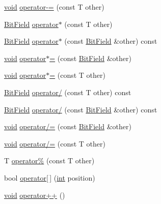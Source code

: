 \begin{DoxyCompactItemize}
\item 
\hyperlink{_s_d_l__opengles2__gl2ext_8h_ae5d8fa23ad07c48bb609509eae494c95}{void} \hyperlink{structmc_1_1_bit_field_acb4ec204eda22806184cd29fe680fafa}{operator-\/=} (const T other)
\item 
\hyperlink{structmc_1_1_bit_field}{Bit\+Field} \hyperlink{structmc_1_1_bit_field_a3c2535a2b22b7e0b03e686d4dab2b8a3}{operator$\ast$} (const T other)
\item 
\hyperlink{structmc_1_1_bit_field}{Bit\+Field} \hyperlink{structmc_1_1_bit_field_ab372262696caa9c17635e1f29303582b}{operator$\ast$} (const \hyperlink{structmc_1_1_bit_field}{Bit\+Field} \&other) const 
\item 
\hyperlink{_s_d_l__opengles2__gl2ext_8h_ae5d8fa23ad07c48bb609509eae494c95}{void} \hyperlink{structmc_1_1_bit_field_a3625c6479695427ddf43f24bee18e416}{operator$\ast$=} (const \hyperlink{structmc_1_1_bit_field}{Bit\+Field} \&other)
\item 
\hyperlink{_s_d_l__opengles2__gl2ext_8h_ae5d8fa23ad07c48bb609509eae494c95}{void} \hyperlink{structmc_1_1_bit_field_ac7980b8955c0b0ed3274dd390ab00dc0}{operator$\ast$=} (const T other)
\item 
\hyperlink{structmc_1_1_bit_field}{Bit\+Field} \hyperlink{structmc_1_1_bit_field_a7218319586bd58f636eeff7e30723d86}{operator/} (const T other) const 
\item 
\hyperlink{structmc_1_1_bit_field}{Bit\+Field} \hyperlink{structmc_1_1_bit_field_afa50f1186f9a86193a47a51218469fb4}{operator/} (const \hyperlink{structmc_1_1_bit_field}{Bit\+Field} \&other) const 
\item 
\hyperlink{_s_d_l__opengles2__gl2ext_8h_ae5d8fa23ad07c48bb609509eae494c95}{void} \hyperlink{structmc_1_1_bit_field_a376f642fb685b0b52eebcc879e89a48b}{operator/=} (const \hyperlink{structmc_1_1_bit_field}{Bit\+Field} \&other)
\item 
\hyperlink{_s_d_l__opengles2__gl2ext_8h_ae5d8fa23ad07c48bb609509eae494c95}{void} \hyperlink{structmc_1_1_bit_field_ac3d40c0b58903af779eb6f87baf229e3}{operator/=} (const T other)
\item 
T \hyperlink{structmc_1_1_bit_field_a0a3a88acae62dec8cd021353de24c52a}{operator\%} (const T other)
\item 
bool \hyperlink{structmc_1_1_bit_field_ad5942474095b63182f1efda28385e9e7}{operator\mbox{[}$\,$\mbox{]}} (\hyperlink{_s_d_l__thread_8h_a6a64f9be4433e4de6e2f2f548cf3c08e}{int} position)
\item 
\hyperlink{_s_d_l__opengles2__gl2ext_8h_ae5d8fa23ad07c48bb609509eae494c95}{void} \hyperlink{structmc_1_1_bit_field_a25e9f569bb29b4ffbfc76a3d14812a61}{operator++} ()

\end{DoxyCompactItemize}
